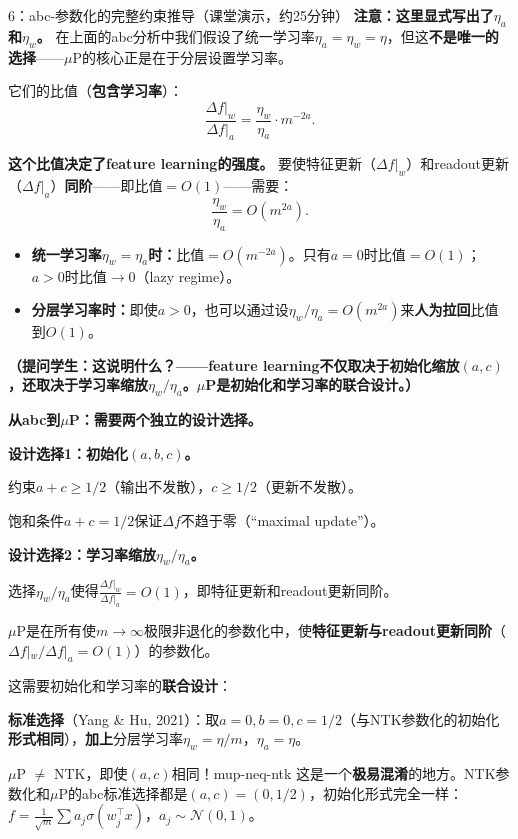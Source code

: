 \documentclass[11pt,a4paper]{article}
\newcommand{\cN}{\mathcal{N}}
\begin{document}
\begin{handcalc}{6：abc-参数化的完整约束推导（课堂演示，约25分钟）}
\textbf{注意：这里显式写出了$\eta_a$和$\eta_w$。} 在上面的abc分析中我们假设了统一学习率$\eta_a=\eta_w=\eta$，但这\textbf{不是唯一的选择}——$\mu$P的核心正是在于分层设置学习率。

它们的比值（\textbf{包含学习率}）：
\[
\boxed{\frac{\Delta f|_w}{\Delta f|_a} = \frac{\eta_w}{\eta_a}\cdot m^{-2a}.}
\]

\textbf{这个比值决定了feature learning的强度。} 要使特征更新（$\Delta f|_w$）和readout更新（$\Delta f|_a$）\textbf{同阶}——即比值$=O(1)$——需要：
\[
\frac{\eta_w}{\eta_a} = O(m^{2a}).
\]

\begin{itemize}[leftmargin=*]
\item \textbf{统一学习率$\eta_w=\eta_a$时：}比值$=O(m^{-2a})$。只有$a=0$时比值$=O(1)$；$a>0$时比值$\to 0$（lazy regime）。
\item \textbf{分层学习率时：}即使$a>0$，也可以通过设$\eta_w/\eta_a = O(m^{2a})$来\textbf{人为拉回}比值到$O(1)$。
\end{itemize}

\textbf{（提问学生：这说明什么？——feature learning不仅取决于初始化缩放$(a,c)$，还取决于学习率缩放$\eta_w/\eta_a$。$\mu$P是初始化和学习率的\textbf{联合设计}。）}

\bigskip
\textbf{从abc到$\mu$P：需要两个独立的设计选择。}

\textbf{设计选择1：初始化$(a,b,c)$。}

约束$a+c\ge 1/2$（输出不发散），$c\ge 1/2$（更新不发散）。

饱和条件$a+c=1/2$保证$\Delta f$不趋于零（``maximal update''）。

\textbf{设计选择2：学习率缩放$\eta_w/\eta_a$。}

选择$\eta_w/\eta_a$使得$\frac{\Delta f|_w}{\Delta f|_a}=O(1)$，即特征更新和readout更新同阶。

\begin{tcolorbox}[colback=red!5,colframe=red!60!black,title=\textbf{$\mu$P的精确定义}]
$\mu$P是在所有使$m\to\infty$极限非退化的参数化中，使\textbf{特征更新与readout更新同阶}（$\Delta f|_w / \Delta f|_a = O(1)$）的参数化。

这需要初始化和学习率的\textbf{联合设计}：

\medskip
\textbf{标准选择}（Yang \& Hu, 2021）：取$a=0, b=0, c=1/2$（与NTK参数化的初始化\textbf{形式相同}），\textbf{加上}分层学习率$\eta_w = \eta/m$，$\eta_a = \eta$。
\end{tcolorbox}

\begin{remark}{$\mu$P $\neq$ NTK，即使$(a,c)$相同！}{mup-neq-ntk}
这是一个\textbf{极易混淆}的地方。NTK参数化和$\mu$P的abc标准选择都是$(a,c)=(0,1/2)$，初始化形式完全一样：$f=\frac{1}{\sqrt{m}}\sum a_j\sigma(w_j^\top x)$，$a_j\sim\cN(0,1)$。


\end{remark}
\end{handcalc}
\end{document}
